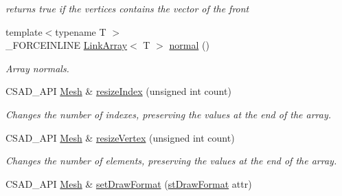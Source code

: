 \begin{DoxyCompactItemize}
\begin{DoxyCompactList}\small\item\em returns true if the vertices contains the vector of the front \end{DoxyCompactList}\item 
\hypertarget{classcsad_1_1_mesh_a318ef5aa68a31189edcbb88c86c53d11}{{\footnotesize template$<$typename T $>$ }\\\-\_\-\-F\-O\-R\-C\-E\-I\-N\-L\-I\-N\-E \hyperlink{classbt_1_1_link_array}{Link\-Array}$<$ T $>$ \hyperlink{classcsad_1_1_mesh_a318ef5aa68a31189edcbb88c86c53d11}{normal} ()}\label{classcsad_1_1_mesh_a318ef5aa68a31189edcbb88c86c53d11}

\begin{DoxyCompactList}\small\item\em Array normals. \end{DoxyCompactList}\item 
\hypertarget{classcsad_1_1_mesh_aed3508dc678922784b993b5d0f9f3d7e}{C\-S\-A\-D\-\_\-\-A\-P\-I \hyperlink{classcsad_1_1_mesh}{Mesh} \& \hyperlink{classcsad_1_1_mesh_aed3508dc678922784b993b5d0f9f3d7e}{resize\-Index} (unsigned int count)}\label{classcsad_1_1_mesh_aed3508dc678922784b993b5d0f9f3d7e}

\begin{DoxyCompactList}\small\item\em Changes the number of indexes, preserving the values at the end of the array. \end{DoxyCompactList}\item 
\hypertarget{classcsad_1_1_mesh_ac085ab6ad1014f2b95bc0da85997cf8b}{C\-S\-A\-D\-\_\-\-A\-P\-I \hyperlink{classcsad_1_1_mesh}{Mesh} \& \hyperlink{classcsad_1_1_mesh_ac085ab6ad1014f2b95bc0da85997cf8b}{resize\-Vertex} (unsigned int count)}\label{classcsad_1_1_mesh_ac085ab6ad1014f2b95bc0da85997cf8b}

\begin{DoxyCompactList}\small\item\em Changes the number of elements, preserving the values at the end of the array. \end{DoxyCompactList}\item 
\hypertarget{classcsad_1_1_mesh_a70f83064ff22715e6a0ae5f4894472c2}{C\-S\-A\-D\-\_\-\-A\-P\-I \hyperlink{classcsad_1_1_mesh}{Mesh} \& \hyperlink{classcsad_1_1_mesh_a70f83064ff22715e6a0ae5f4894472c2}{set\-Draw\-Format} (\hyperlink{classcsad_1_1_mesh_a0992cfc5c22b440ba3db818112d69caf}{st\-Draw\-Format} attr)}\label{classcsad_1_1_mesh_a70f83064ff22715e6a0ae5f4894472c2}


\end{DoxyCompactItemize}

